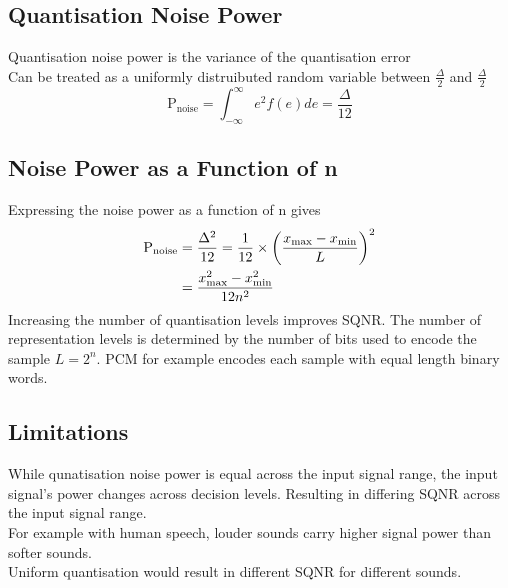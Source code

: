 \documentclass[oneside]{book}
\begin{document}
            \subsection{Quantisation Noise Power}
                Quantisation noise power is the variance of the quantisation error\\
                Can be treated as a uniformly distruibuted random variable between $\frac{\Delta}{2}$ and $\frac{\Delta}{2}$\\
                \begin{equation}
                    \text{P}_{\text{noise}} = \int^{\infty}_{-\infty} e^2 f(e) de = \frac{\Delta}{12}
                \end{equation}
            \subsection{Noise Power as a Function of n}
                Expressing the noise power as a function of n gives
                    \begin{align}
                        \text{P}_{\text{noise}} &= \frac{\Delta^2}{12} = \frac{1}{12} \times \left(\frac{x_{\text{max}} - x_{\text{min}}}{L}\right)^2 \notag\\
                        &= \frac{x_{\text{max}}^2 - x_{\text{min}}^2}{12 n^2}
                    \end{align}
                Increasing the number of quantisation levels improves SQNR. The number of representation levels is determined by
                the number of bits used to encode the sample $L=2^n$. PCM for example encodes each sample with equal length binary words.
            \subsection{Limitations}
                While qunatisation noise power is equal across the input signal range, the input signal's power changes across decision levels.
                Resulting in differing SQNR across the input signal range.\\
                For example with human speech, louder sounds carry higher signal power than softer sounds.\\
                Uniform quantisation would result in different SQNR for different sounds.\\
\end{document}
